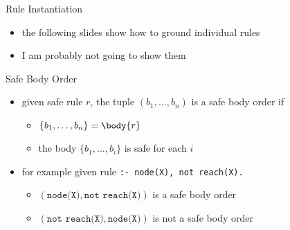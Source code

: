 \begin{frame}{Rule Instantiation}
  \vfill
  \begin{itemize}
    \item the following slides show how to ground individual rules
    \item I am probably not going to show them
  \end{itemize}
\end{frame}

\begin{frame}{Safe Body Order}
  \vfill
  \begin{itemize}
    \item given safe rule \(r\), the tuple \((b_1, \dots, b_n)\) is a \alert{safe body order} if
      \begin{itemize}
        \item \(\{ b_1 ,\dots , b_n \} = \body{r} \)
        \item the body \(\{b_1, \dots, b_i\}\) is safe for each \(i\)
      \end{itemize}
      \pause
    \item for \alert{example} given rule \texttt{:- node(X), not reach(X).}
      \begin{itemize}
        \item \((\texttt{node(X)}, \texttt{not reach(X)})\) is a safe body order
        \item \((\texttt{not reach(X)}, \texttt{node(X)})\) is not a safe body order
      \end{itemize}
  \end{itemize}
\end{frame}

